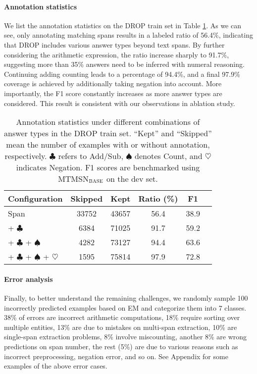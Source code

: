 \documentclass[11pt,a4paper]{article}
\newcommand\mtmsnbase{MTMSN$_{\textsc{BASE}}$\xspace}
\begin{document}
\paragraph{Annotation statistics}
We list the annotation statistics on the DROP train set in Table \ref{table:statis}. 
As we can see, only annotating matching spans results in a labeled ratio of 56.4\%, indicating that DROP includes various answer types beyond text spans.
By further considering the arithmetic expression, the ratio increase sharply to 91.7\%, suggesting more than 35\% answers need to be inferred with numeral reasoning.
Continuing adding counting leads to a percentage of 94.4\%, and a final 97.9\% coverage is achieved by additionally taking negation into account.
More importantly, the F1 score constantly increases as more answer types are considered. This result is consistent with our observations in ablation study.

\begin{table}
	\begin{center}
		\small
		\begin{tabular}{l|ccccc}
			\toprule
			Configuration & Skipped & Kept & Ratio (\%) & F1  \\ 
			\midrule
			Span                & 33752 & 43657 & 56.4 & 38.9 \\
			+ $\clubsuit$            & 6384 & 71025 & 91.7 & 59.2 \\
			+ $\clubsuit$ + $\spadesuit$              & 4282 & 73127 & 94.4 & 63.6 \\
			+ $\clubsuit$ + $\spadesuit$ + $\heartsuit$           & 1595 & 75814 & 97.9 & 72.8 \\
			\bottomrule
		\end{tabular}
		\caption{\label{table:statis} Annotation statistics under different combinations of answer types in the DROP train set. ``Kept'' and ``Skipped'' mean the number of examples with or without annotation, respectively. $\clubsuit$ refers to Add/Sub, $\spadesuit$ denotes Count, and $\heartsuit$ indicates Negation. F1 scores are benchmarked using \mtmsnbase on the dev set.}
	\end{center}
\end{table}

\paragraph{Error analysis}
Finally, to better understand the remaining challenges, we randomly sample 100 incorrectly predicted examples based on EM and categorize them into 7 classes.
38\% of errors are incorrect arithmetic computations, 18\% require sorting over multiple entities, 13\% are due to mistakes on multi-span extraction, 10\% are single-span extraction problems, 8\% involve miscounting, another 8\% are wrong predictions on span number, the rest (5\%) are due to various reasons such as incorrect preprocessing, negation error, and so on.
See Appendix for some examples of the above error cases.
\end{document}
